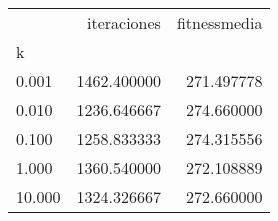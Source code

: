 \begin{tabular}{lrr}
\toprule
{} &  iteraciones &  fitnessmedia \\
k      &              &               \\
\midrule
0.001  &  1462.400000 &    271.497778 \\
0.010  &  1236.646667 &    274.660000 \\
0.100  &  1258.833333 &    274.315556 \\
1.000  &  1360.540000 &    272.108889 \\
10.000 &  1324.326667 &    272.660000 \\
\bottomrule
\end{tabular}
